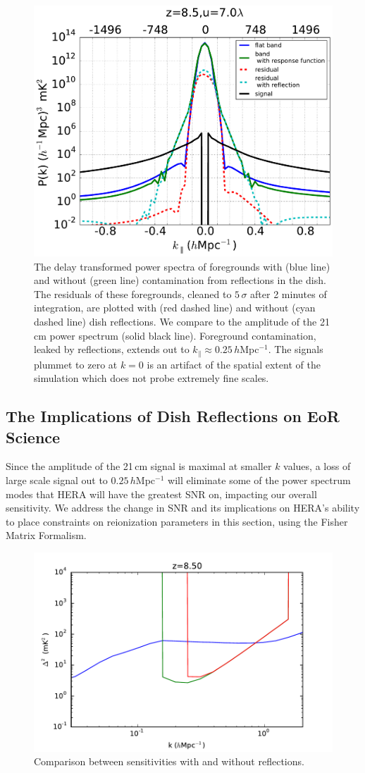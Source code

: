 \documentclass[onecolumn]{emulateapj}
\begin{document}
\begin{figure}
\centering
\includegraphics[width=.5\textwidth]{figures/resid_5sigma_compare.pdf}
\caption{The delay transformed power spectra of foregrounds with (blue line) and without (green line) contamination from reflections in the dish. The residuals of these foregrounds, cleaned to $5\,\sigma$ after 2 minutes of integration, are plotted with (red dashed line) and without (cyan dashed line) dish reflections. We compare to the amplitude of the 21\,cm power spectrum (solid black line). Foreground contamination, leaked by reflections, extends out to $k_\parallel \approx 0.25$\,$h$Mpc$^{-1}$. The signals plummet to zero at $k=0$ is an artifact of the spatial extent of the simulation which does not probe extremely fine scales.}
\label{fig:SignalCompare}
\end{figure}

\subsection{The Implications of Dish Reflections on EoR Science}
Since the amplitude of the 21\,cm signal is maximal at smaller $k$ values, a loss of large scale signal out to $0.25$\,$h$Mpc$^{-1}$ will eliminate some of the power spectrum modes that HERA will have the greatest SNR on, impacting our overall sensitivity. We address the change in SNR and its implications on HERA's ability to place constraints on reionization parameters in this section, using the Fisher Matrix Formalism. 



\begin{figure}
\includegraphics[width=.5\textwidth]{figures/sensitivity_comparison.pdf}
\caption{Comparison between sensitivities with and without reflections.}
\end{figure}
\end{document}
